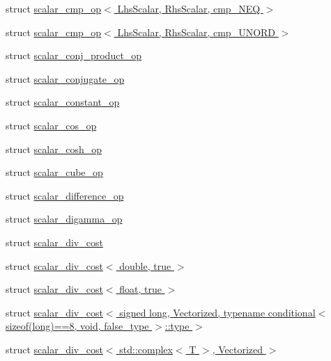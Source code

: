 \begin{DoxyCompactItemize}
\item 
struct \hyperlink{struct_eigen_1_1internal_1_1scalar__cmp__op_3_01_lhs_scalar_00_01_rhs_scalar_00_01cmp___n_e_q_01_4}{scalar\+\_\+cmp\+\_\+op$<$ Lhs\+Scalar, Rhs\+Scalar, cmp\+\_\+\+N\+E\+Q $>$}
\item 
struct \hyperlink{struct_eigen_1_1internal_1_1scalar__cmp__op_3_01_lhs_scalar_00_01_rhs_scalar_00_01cmp___u_n_o_r_d_01_4}{scalar\+\_\+cmp\+\_\+op$<$ Lhs\+Scalar, Rhs\+Scalar, cmp\+\_\+\+U\+N\+O\+R\+D $>$}
\item 
struct \hyperlink{struct_eigen_1_1internal_1_1scalar__conj__product__op}{scalar\+\_\+conj\+\_\+product\+\_\+op}
\item 
struct \hyperlink{struct_eigen_1_1internal_1_1scalar__conjugate__op}{scalar\+\_\+conjugate\+\_\+op}
\item 
struct \hyperlink{struct_eigen_1_1internal_1_1scalar__constant__op}{scalar\+\_\+constant\+\_\+op}
\item 
struct \hyperlink{struct_eigen_1_1internal_1_1scalar__cos__op}{scalar\+\_\+cos\+\_\+op}
\item 
struct \hyperlink{struct_eigen_1_1internal_1_1scalar__cosh__op}{scalar\+\_\+cosh\+\_\+op}
\item 
struct \hyperlink{struct_eigen_1_1internal_1_1scalar__cube__op}{scalar\+\_\+cube\+\_\+op}
\item 
struct \hyperlink{struct_eigen_1_1internal_1_1scalar__difference__op}{scalar\+\_\+difference\+\_\+op}
\item 
struct \hyperlink{struct_eigen_1_1internal_1_1scalar__digamma__op}{scalar\+\_\+digamma\+\_\+op}
\item 
struct \hyperlink{struct_eigen_1_1internal_1_1scalar__div__cost}{scalar\+\_\+div\+\_\+cost}
\item 
struct \hyperlink{struct_eigen_1_1internal_1_1scalar__div__cost_3_01double_00_01true_01_4}{scalar\+\_\+div\+\_\+cost$<$ double, true $>$}
\item 
struct \hyperlink{struct_eigen_1_1internal_1_1scalar__div__cost_3_01float_00_01true_01_4}{scalar\+\_\+div\+\_\+cost$<$ float, true $>$}
\item 
struct \hyperlink{struct_eigen_1_1internal_1_1scalar__div__cost_3_01signed_01long_00_01_vectorized_00_01typename_0928d7226c6d88e74072f0f5e87ecaa67}{scalar\+\_\+div\+\_\+cost$<$ signed long, Vectorized, typename conditional$<$ sizeof(long)==8, void, false\+\_\+type $>$\+::type $>$}
\item 
struct \hyperlink{struct_eigen_1_1internal_1_1scalar__div__cost_3_01std_1_1complex_3_01_t_01_4_00_01_vectorized_01_4}{scalar\+\_\+div\+\_\+cost$<$ std\+::complex$<$ T $>$, Vectorized $>$}

\end{DoxyCompactItemize}
